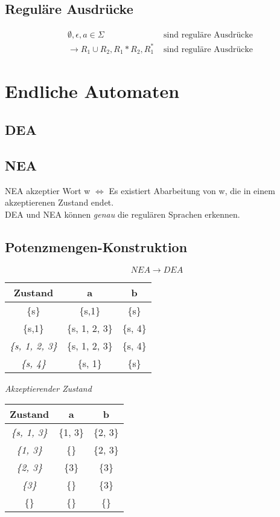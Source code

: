 \documentclass[a4paper]{scrartcl}
\begin{document}
		\subsection{Reguläre Ausdrücke}
			\begin{align*}
				&\emptyset , \epsilon, a \in \Sigma &\text{ sind reguläre Ausdrücke}\\
				&\rightarrow R_1 \cup R_2, R_1 * R_2, R_1^* &\text{ sind reguläre Ausdrücke}
			\end{align*}
							
	\section{Endliche Automaten}
		\subsection{DEA}
		\subsection{NEA}
			NEA akzeptier Wort w \( \iff \) Es existiert Abarbeitung von w, die in einem akzeptierenen Zustand endet. \\
			DEA und NEA können \emph{genau} die regulären Sprachen erkennen.
		
		\subsection{Potenzmengen-Konstruktion}
			\[NEA \rightarrow DEA \]
			\begin{table}[h]
				\centering
				\begin{tabular}{|c|c|c|}
				\hline 
				Zustand & a & b \\ 
				\hline 
				\{s\} & \{s,1\} & \{s\} \\ 
				\hline 
				\{s,1\} & \{s, 1, 2, 3\} & \{s, 4\} \\ 
				\hline 
				\emph{\{s, 1, 2, 3\}} & \{s, 1, 2, 3\} & \{s, 4\} \\ 
				\hline 
				\emph{\{s, 4\}} & \{s, 1\} & \{s\} \\ 
				\hline
			\end{tabular} 
			\end{table}
		\emph{Akzeptierender Zustand}
		
		\begin{table}[h]
			\centering
			\begin{tabular}{|c|c|c|}
				\hline 
				Zustand & a & b \\ 
				\hline 
				\emph{\{s, 1, 3\}} & \{1, 3\} & \{2, 3\} \\ 
				\hline 
				\emph{\{1, 3\}} & \{\} & \{2, 3\} \\ 
				\hline 
				\emph{\{2, 3\}} & \{3\} & \{3\} \\ 
				\hline 
				\emph{\{3\}} & \{\} & \{3\} \\ 
				\hline 
				\{\} & \{\} & \{\} \\ 
				\hline 
			\end{tabular} 
		\end{table}
		
\end{document}
